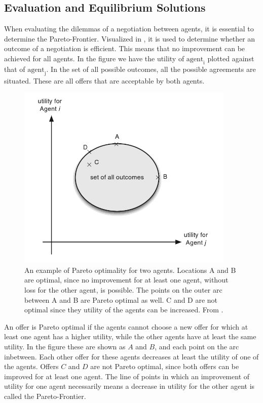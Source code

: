 \subsection{Evaluation and Equilibrium Solutions}
When evaluating the dilemmas of a negotiation between agents, it is essential to determine the Pareto-Frontier. Visualized in , it is used to determine whether an outcome of a negotiation is efficient. This means that no improvement can be achieved for all agents. In the figure we have the utility of $\text{agent}_\text{i}$ plotted against that of  $\text{agent}_\text{j}$. In the set of all possible outcomes, all the possible agreements are situated. These are all offers that are acceptable by both agents.

\begin{figure}[h]
	\centering
	\includegraphics[width=0.7\linewidth]{img/parito_optimal.png}
	\caption{An example of Pareto optimality for two agents. Locations A and B are optimal, since no improvement for at least one agent, without loss for the other agent, is possible. The points on the outer arc between A and B are Pareto optimal as well. C and D are not optimal since they utility of the agents can be increased. From \citep{fatima2014principles}.}
	\label{fig:paritooptimal}
\end{figure}

An offer is Pareto optimal if the agents cannot choose a new offer for which at least one agent has a higher utility, while the other agents have at least the same utility. In the figure these are shown as $A$ and $B$, and each point on the arc inbetween. Each other offer for these agents decreases at least the utility of one of the agents. Offers $C$ and $D$ are not Pareto optimal, since both offers can be improved for at least one agent. The line of points in which an improvement of utility for one agent necessarily means a decrease in utility for the other agent is called the Pareto-Frontier. 

